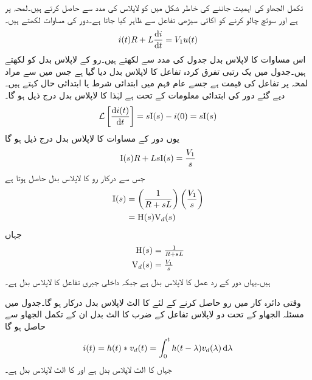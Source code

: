 تکمل الجھاو کی اہمیت جاننے کی خاطر  شکل  میں  کو لاپلاس کی مدد سے حاصل کرتے ہیں۔لمحہ  پر  ہے اور سوئچ چالو کرنے کو اکائی سیڑھی تفاعل  سے ظاہر کیا جاتا ہے۔دور کی مساوات لکھتے ہیں۔
\begin{align*}
i(t)R+L\frac{\dif i}{\dif t}=V_1 u(t)
\end{align*}
اس مساوات کا لاپلاس بدل جدول  کی مدد سے لکھتے ہیں۔رو کے لاپلاس بدل کو  لکھتے ہیں۔جدول میں یک رتبی تفرق کردہ تفاعل کا لاپلاس بدل دیا گیا ہے جس میں  سے مراد لمحہ  پر تفاعل کی قیمت ہے جسے عام فہم میں ابتدائی شرط یا ابتدائی حال کہتے ہیں۔دیے گئے دور کی ابتدائی معلومات کے تحت  ہے لہٰذا  کا لاپلاس بدل درج ذیل ہو گا۔
\begin{align*}
\Laplace\left[\frac{\dif i(t)}{\dif t}\right]=s\bI(s)-i(0)=s\bI(s)
\end{align*} 
یوں دور کے مساوات کا لاپلاس بدل درج ذیل ہو گا
\begin{align*}
{\ensuremath{{\textup{I}}}}(s)R+Ls{{\textup{I}}}(s)=\frac{V_1}{s}
\end{align*}
جس سے درکار رو کا لاپلاس بدل حاصل ہوتا ہے
\begin{gather}
\begin{aligned}\label{مساوات_لاپلاس_دور_ردعمل_الف}
{\ensuremath{{\textup{I}}}}(s)&=\left(\frac{1}{R+sL}\right)\left(\frac{V_1}{s}\right)\\
&={{\textup{H}}}(s) {{\textup{V}}}_d(s)
\end{aligned}
\end{gather}
جہاں
\begin{align*}
{\ensuremath{{\textup{H}}}}(s)&=\tfrac{1}{R+sL}\\
{{\textup{V}}}_{d}(s)&=\tfrac{V_1}{s}
\end{align*}
ہیں۔یہاں  دور کے رد عمل کا لاپلاس بدل ہے جبکہ  داخلی جبری تفاعل کا لاپلاس بدل ہے۔

وقتی دائرہ کار میں رو  حاصل کرنے کے لئے  کا الٹ لاپلاس بدل درکار ہو گا۔جدول  میں مسئلہ الجھاو کے تحت دو لاپلاس تفاعل کے ضرب کا الٹ بدل ان کے تکمل الجھاو سے حاصل ہو گا
\begin{align}\label{مساوات_لاپلاس_دور_ردعمل_ب}
i(t)=h(t) \ast v_d(t)=\int_0^t h(t-\lambda) v_d(\lambda) \dif \lambda
\end{align}
جہاں  کا الٹ لاپلاس بدل  ہے اور  کا الٹ لاپلاس بدل  ہے۔


